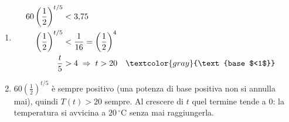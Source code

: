 \begin{question}[ID=6.4, subtitle={Raffreddamento di una tazza di tè}, difficulty=difficile, tags={problemi, esponenziali, decadimento, raffreddamento}]
\begin{explanation}
\begin{enumerate}[label=\alph*),leftmargin=1.8cm]
\[\begin{aligned}
    \left(\dfrac12\right)^{t/5} &= \dfrac{7{,}5}{60}=\dfrac18=\left(\dfrac12\right)^3\\
    t &= 15
    \end{aligned}\]
    \item \[\begin{aligned}
    60\left(\dfrac12\right)^{t/5} &< 3{,}75\\
    \left(\dfrac12\right)^{t/5} &< \dfrac1{16}=\left(\dfrac12\right)^4\\
    \dfrac t5 &> 4 \;\Rightarrow\; t>20 && \textcolor{gray}{\text{base $<1$}}
    \end{aligned}\]
    \item $60\left(\tfrac12\right)^{t/5}$ è sempre positivo (una potenza di base positiva non si annulla mai), quindi $T(t)>20$ sempre. Al crescere di $t$ quel termine tende a $0$: la temperatura si avvicina a $20\,{}^\circ\text{C}$ senza mai raggiungerla.
\end{enumerate}
\end{explanation}
\end{question}


